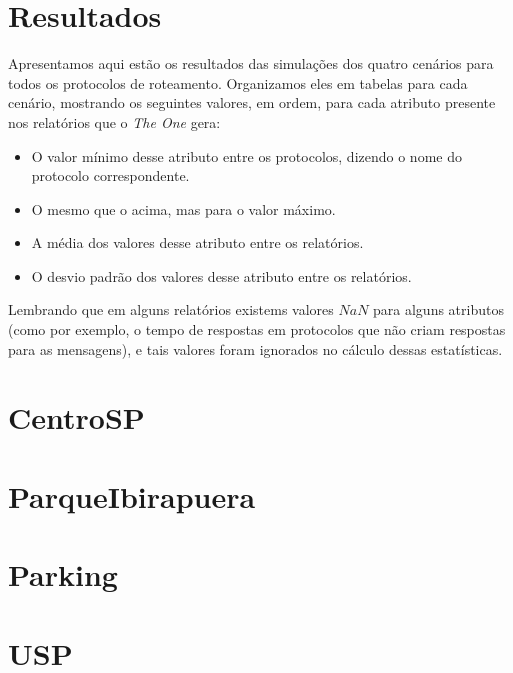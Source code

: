 




\cabecalho

\section{Resultados}
Apresentamos aqui estão os resultados das simulações dos quatro cenários para todos os protocolos de roteamento.
Organizamos eles em tabelas para cada cenário, mostrando os seguintes valores, em ordem, para cada atributo
presente nos relatórios que o \emph{The One} gera:
\begin{itemize}
  \item O valor mínimo desse atributo entre os protocolos, dizendo o nome do protocolo correspondente.
  \item O mesmo que o acima, mas para o valor máximo.
  \item A média dos valores desse atributo entre os relatórios.
  \item O desvio padrão dos valores desse atributo entre os relatórios.
\end{itemize}

Lembrando que em alguns relatórios existems valores $NaN$ para alguns atributos (como por exemplo, o tempo de respostas
em protocolos que não criam respostas para as mensagens), e tais valores foram ignorados no cálculo dessas estatísticas.

\section{CentroSP}



\section{ParqueIbirapuera}



\section{Parking}



\section{USP}




